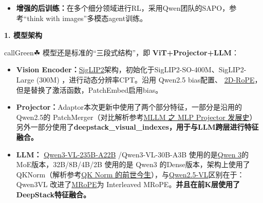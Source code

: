 \documentclass[zihao=false,fontset=windows]{ctexart}
\newcommand{\incode}[1]{\colorbox{inlinebg}{\ttfamily\small #1}}
\begin{document}
\begin{itemize}[label=\textcolor{feishuBlue}{3.}]
\item \textbf{增强的后训练：}在多个细分领域进行RL，采用Qwen团队的SAPO，参考“think with images”多模态agent训练。

\end{itemize}

\Needspace{3cm}\par\vspace{0.9em}\begin{tcolorbox}[enhanced,colback=headRed,boxrule=0pt,arc=4pt,boxsep=0pt,left=3pt,right=3pt,top=2pt,bottom=2pt,before skip=0pt,after skip=3pt]\bfseries \textcolor{feishuBlue}{1.} 模型架构\end{tcolorbox}

\begin{feishubox}{callGreen}{☘}
模型还是标准的“三段式结构”，即 \textcolor{feishuRed}{\textbf{ViT+Projector+LLM}}：\par

\begin{itemize}[label=\textcolor{feishuBlue}{\textbullet}]
\item \textbf{Vision Encoder：}\href{https://scnajei2ds6y.feishu.cn/wiki/H3biwpNrQiAgk2kd9bscXeS2nkb}{SigLIP2}架构，初始化于SigLIP2-SO-400M、SigLIP2-Large (300M) ，进行动态分辨率CPT。沿用 Qwen2.5 bias配置、 \href{https://scnajei2ds6y.feishu.cn/wiki/BHUIwyfVUizmwQkKQPFceqJrnEe}{2D-RoPE}，但是替换了激活函数，PatchEmbed启用bias。

\end{itemize}

\begin{itemize}[label=\textcolor{feishuBlue}{\textbullet}]
\item \textbf{Projector：}Adaptor本次更新中使用了两个部分特征，一部分是沿用的Qwen2.5的 PatchMerger（对比解析参考\href{https://scnajei2ds6y.feishu.cn/wiki/KQDVwj7bAiSz8akJd3ecLLPank3}{MLLM 之 MLP Projector 发展史}）另外一部分使用了\textcolor{feishuRed}{\textbf{\incode{deepstack\_visual\_indexes}}}\textcolor{feishuRed}{\textbf{，用于与LLM跨层进行特征融合。}}

\end{itemize}

\begin{itemize}[label=\textcolor{feishuBlue}{\textbullet}]
\item \textbf{LLM：} \href{https://huggingface.co/Qwen/Qwen3-VL-235B-A22B-Instruct}{Qwen3-VL-235B-A22B} /Qwen3-VL-30B-A3B 使用的是\href{https://swfvqxo30ma.feishu.cn/wiki/Yzb0w1lKJi9EEIkeNHLcpdODnIc?from=from_copylink}{Qwen 3}的MoE版本，32B/8B/4B/2B 使用的是 Qwen3 的Dense版本，架构上使用了QKNorm（解析参考\href{https://swfvqxo30ma.feishu.cn/wiki/V2c5wrPboiCKJNkN5UocxvpLnTe?from=from_copylink}{QK Norm 的前世今生}），与\href{https://scnajei2ds6y.feishu.cn/wiki/S7Q2wviQhiYtQFk4jKvccQwDnWe}{Qwen2.5-VL}区别在于：Qwen3VL 改进了\href{https://scnajei2ds6y.feishu.cn/wiki/JboKw8o8UiaUQbk1CBDckrtFn3f}{MRoPE}为 Interleaved MRoPE。\textcolor{feishuRed}{\textbf{并且在前K层使用了DeepStack特征融合。}}

\end{itemize}

\end{feishubox}
\end{document}
